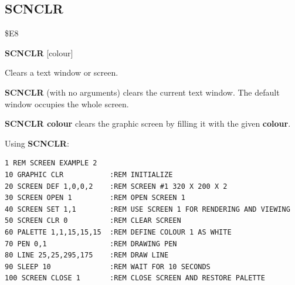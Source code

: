 
\newpage
\subsection{SCNCLR}
\begin{description}[leftmargin=2cm,style=nextline]
\item [Token:] \$E8
\item [Format:] {\bf SCNCLR} [colour]
\item [Usage:] Clears a text window or screen.

               {\bf SCNCLR} (with no arguments) clears the
               current text window. The default window
               occupies the whole screen.

               {\bf SCNCLR colour} clears the graphic screen by
               filling it with the given {\bf colour}.

\item [Example:] Using {\bf SCNCLR}:
\begin{tcolorbox}[colback=black,coltext=white]
\verbatimfont{\codefont}
\begin{verbatim}
1 REM SCREEN EXAMPLE 2
10 GRAPHIC CLR           :REM INITIALIZE
20 SCREEN DEF 1,0,0,2    :REM SCREEN #1 320 X 200 X 2
30 SCREEN OPEN 1         :REM OPEN SCREEN 1
40 SCREEN SET 1,1        :REM USE SCREEN 1 FOR RENDERING AND VIEWING
50 SCREEN CLR 0          :REM CLEAR SCREEN
60 PALETTE 1,1,15,15,15  :REM DEFINE COLOUR 1 AS WHITE
70 PEN 0,1               :REM DRAWING PEN
80 LINE 25,25,295,175    :REM DRAW LINE
90 SLEEP 10              :REM WAIT FOR 10 SECONDS
100 SCREEN CLOSE 1       :REM CLOSE SCREEN AND RESTORE PALETTE
\end{verbatim}
\end{tcolorbox}
\end{description}


\newpage

